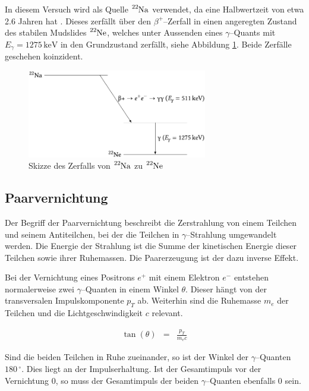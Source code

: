 \documentclass[12pt,a4paper]{scrartcl}
\numberwithin{equation}{section} %
\newcommand{\pu}[1]{\ensuremath{\mathrm{#1}}}
\begin{document}
\noindent
In diesem Versuch wird als Quelle $\ce{^{22}Na}$ verwendet, da eine Halbwertzeit von etwa 2.6 Jahren hat \cite{NuclideChart}. Dieses zerfällt über den $\beta^+$--Zerfall in einen angeregten Zustand des stabilen Mudslides $\ce{^{22}Ne}$, welches unter Aussenden eines $\gamma$--Quants mit $E_\gamma = \pu{1275\, keV}$ in den Grundzustand zerfällt, siehe Abbildung \ref{abb:Skizze 22Na}. Beide Zerfälle geschehen koinzident.

\begin{figure}[h]
	\centering
	\includegraphics[width=0.7\textwidth]{../media/B3.4/Zerfall_22_Na.pdf}
	\caption{Skizze des Zerfalls von $\ce{^{22}Na}$ zu $\ce{^{22}Ne}$ \cite{UzK}}
	\label{abb:Skizze 22Na}
\end{figure}

\hypertarget{paarvernichtung}{%
\subsection{Paarvernichtung}\label{paarvernichtung}}

Der Begriff der Paarvernichtung beschreibt die Zerstrahlung von einem Teilchen und seinem Antiteilchen, bei der die Teilchen in $\gamma$--Strahlung umgewandelt werden. Die Energie der Strahlung ist die Summe der kinetischen Energie dieser Teilchen sowie ihrer Ruhemassen. Die Paarerzeugung ist der dazu inverse Effekt. \cite{Paarvernichtung}

Bei der Vernichtung eines Positrons $e^+$ mit einem Elektron $e^-$ entstehen normalerweise zwei $\gamma$--Quanten in einem Winkel $\theta$. Dieser hängt von der transversalen Impulskomponente $p_T$ ab. Weiterhin sind die Ruhemasse $m_e$ der Teilchen und die Lichtgeschwindigkeit $c$ relevant. \cite{Bethge,Annihilation}

\begin{eqnarray}
    \tan(\theta) &=& \frac{p_T}{m_ec}
\end{eqnarray}

\noindent
Sind die beiden Teilchen in Ruhe zueinander, so ist der Winkel der $\gamma$--Quanten $\pu{180\,^\circ}$. Dies liegt an der Impulserhaltung. Ist der Gesamtimpuls vor der Vernichtung $0$, so muss der Gesamtimpuls der beiden $\gamma$--Quanten ebenfalls $0$ sein.
\end{document}
